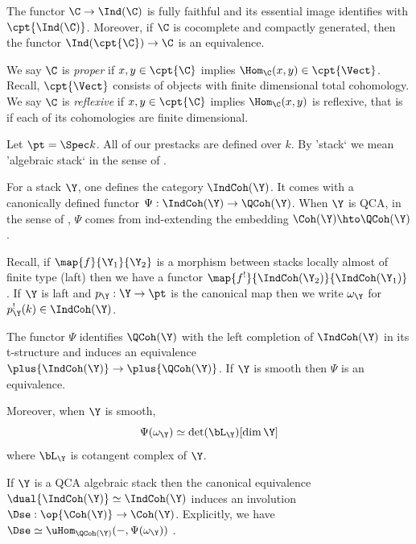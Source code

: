 \documentclass{amsart}
\begin{document}
  \sssec{}

  The functor \(\C \to \Ind(\C)\) is fully faithful and its 
  essential image identifies with \(\cpt{\Ind(\C)}\).
  Moreover, if \(\C\) is cocomplete and compactly generated,
  then the functor \(\Ind(\cpt{\C}) \to \C\) is an
  equivalence.

  \sssec{}

  We say \(\C\) is \emph{proper} if \(x,y \in \cpt{\C}\)
  implies \(\Hom_\C(x,y) \in \cpt{\Vect}\). Recall,
  \(\cpt{\Vect}\) consists of objects with finite
  dimensional total cohomology. We say
  \(\C\) is \emph{reflexive} if \(x,y \in \cpt{\C}\)
  implies \(\Hom_\C(x,y)\) is reflexive,
  that is if each of its cohomologies
  are finite dimensional.


  \sssec{}

  Let \(\pt = \Spec k\). All of our prestacks are defined over \(k\).
  By 'stack` we mean 'algebraic stack` in the sense of \cite{drinfeld_gaitsgory:2013}.

  \sssec{}

  For a stack \(\Y\), one defines the category \(\IndCoh(\Y)\).
  It comes with a canonically defined functor \(\Psi: \IndCoh(\Y) \to \QCoh(\Y)\).
  When \(\Y\) is QCA, in the sense of \cite{drinfeld_gaitsgory:2013},
  \(\Psi\) comes from ind-extending the embedding \(\Coh(\Y) \hto \QCoh(\Y)\).

  Recall, if \(\map{f}{\Y_1}{\Y_2}\) is a morphism between stacks locally
  almost of finite type (laft) then we have a functor \(\map{f^!}{\IndCoh(\Y_2)}{\IndCoh(\Y_1)}\).
  If \(\Y\) is laft and \(p_\Y: \Y \to \pt\) is the canonical map
  then we write \(\omega_\Y\) for \(p_\Y^!(k) \in \IndCoh(\Y)\).

  The functor \(\Psi\) identifies
  \(\QCoh(\Y)\) with the left completion of \(\IndCoh(\Y)\) in
  its t-structure and induces an equivalence \(\plus{\IndCoh(\Y)} \to \plus{\QCoh(\Y)}\).
  If \(\Y\) is smooth then \(\Psi\) is an equivalence.

  Moreover, when \(\Y\) is smooth,
  \begin{displaymath}
    \Psi(\omega_\Y) \simeq \det(\bL_\Y)[\dim \Y]
  \end{displaymath}
  where \(\bL_\Y\) is cotangent complex of \(\Y\).

  \sssec{}

  If \(\Y\) is a QCA algebraic stack then the canonical
  equivalence \(\dual{\IndCoh(\Y)} \simeq \IndCoh(\Y)\)
  induces an involution \(\Dse: \op{\Coh(\Y)} \to \Coh(\Y)\).
  Explicitly, we have \(\Dse \simeq \uHom_{\QCoh(\Y)}(-, \Psi(\omega_\Y))\)
  \cite[4.4]{drinfeld_gaitsgory:2013}.
\end{document}
